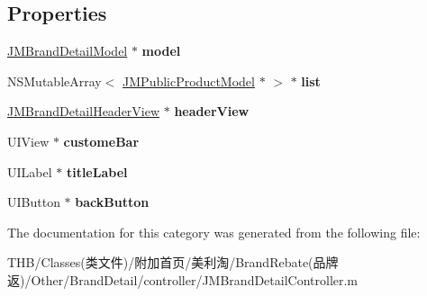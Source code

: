 \subsection*{Properties}
\begin{DoxyCompactItemize}
\item 
\mbox{\label{category_j_m_brand_detail_controller_07_08_afd118afee7dea4d7cf209d4a7532f0c6}} 
\mbox{\hyperlink{interface_j_m_brand_detail_model}{J\+M\+Brand\+Detail\+Model}} $\ast$ {\bfseries model}
\item 
\mbox{\label{category_j_m_brand_detail_controller_07_08_a7a448810406df97f2f120c0c88c49473}} 
N\+S\+Mutable\+Array$<$ \mbox{\hyperlink{interface_j_m_public_product_model}{J\+M\+Public\+Product\+Model}} $\ast$ $>$ $\ast$ {\bfseries list}
\item 
\mbox{\label{category_j_m_brand_detail_controller_07_08_a03671b3062f0afa9b79c9dc8b6015ffc}} 
\mbox{\hyperlink{interface_j_m_brand_detail_header_view}{J\+M\+Brand\+Detail\+Header\+View}} $\ast$ {\bfseries header\+View}
\item 
\mbox{\label{category_j_m_brand_detail_controller_07_08_aec32b51ddb7cd800ff6e328e79b21c1a}} 
U\+I\+View $\ast$ {\bfseries custome\+Bar}
\item 
\mbox{\label{category_j_m_brand_detail_controller_07_08_aaff31fbe2899ad5a569ed70774871d09}} 
U\+I\+Label $\ast$ {\bfseries title\+Label}
\item 
\mbox{\label{category_j_m_brand_detail_controller_07_08_a4551aef5361d31f7f7b2e2c144cea7c0}} 
U\+I\+Button $\ast$ {\bfseries back\+Button}
\end{DoxyCompactItemize}


The documentation for this category was generated from the following file\+:\begin{DoxyCompactItemize}
\item 
T\+H\+B/\+Classes(类文件)/附加首页/美利淘/\+Brand\+Rebate(品牌返)/\+Other/\+Brand\+Detail/controller/J\+M\+Brand\+Detail\+Controller.\+m\end{DoxyCompactItemize}
